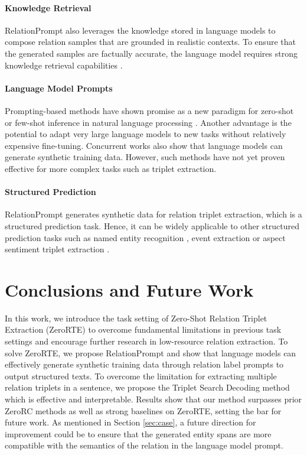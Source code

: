 \documentclass[11pt]{article}
\begin{document}
\paragraph{Knowledge Retrieval}
RelationPrompt also leverages the knowledge stored in language models \cite{roberts2020much} to compose relation samples that are grounded in realistic contexts.
To ensure that the generated samples are factually accurate, the language model requires strong knowledge retrieval capabilities \cite{petroni2019language}.

\paragraph{Language Model Prompts}
Prompting-based methods have shown promise as a new paradigm for zero-shot or few-shot inference in natural language processing \cite{liu2021pre}.
Another advantage is the potential to adapt very large language models \cite{reynolds2021prompt} to new tasks without relatively expensive fine-tuning.
Concurrent works \cite{Meng2022GeneratingTD, Ye2022ZeroGenEZ} also show that language models can generate synthetic training data.
However, such methods have not yet proven effective for more complex tasks such as triplet extraction.

\paragraph{Structured Prediction}
RelationPrompt generates synthetic data for relation triplet extraction, which is a structured prediction task.
Hence, it can be widely applicable to other structured prediction tasks such as named entity recognition \cite{aly-etal-2021-leveraging}, event extraction \cite{huang-etal-2018-zero} or aspect sentiment triplet extraction \cite{xu-etal-2021-learning}.

\section{Conclusions and Future Work}
In this work, we introduce the task setting of Zero-Shot Relation Triplet Extraction (ZeroRTE) to overcome fundamental limitations in previous task settings and encourage further research in low-resource relation extraction. 
To solve ZeroRTE, we propose RelationPrompt and show that language models can effectively generate synthetic training data through relation label prompts to output structured texts.
To overcome the limitation for extracting multiple relation triplets in a sentence, we propose the Triplet Search Decoding method which is effective and interpretable.
Results show that our method surpasses prior ZeroRC methods as well as strong baselines on ZeroRTE, setting the bar for future work.
As mentioned in Section \ref{sec:case}, a future direction for improvement could be to ensure that the generated entity spans are more compatible with the semantics of the relation in the language model prompt.
\end{document}
